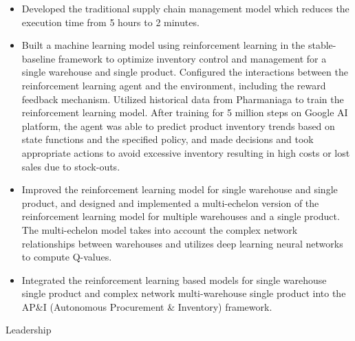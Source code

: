 \documentclass[margin, 10pt]{res} %
\begin{document}
\begin{resume}
\begin{itemize}
    \item Developed the traditional supply chain management model which reduces the execution time from 5 hours to 2 minutes.
    \item Built a machine learning model using reinforcement learning in the stable-baseline framework to optimize inventory control and management for a single warehouse and single product. Configured the interactions between the reinforcement learning agent and the environment, including the reward feedback mechanism. Utilized historical data from Pharmaniaga to train the reinforcement learning model. After training for 5 million steps on Google AI platform, the agent was able to predict product inventory trends based on state functions and the specified policy, and made decisions and took appropriate actions to avoid excessive inventory resulting in high costs or lost sales due to stock-outs.
    \item Improved the reinforcement learning model for single warehouse and single product, and designed and implemented a multi-echelon version of the reinforcement learning model for multiple warehouses and a single product. The multi-echelon model takes into account the complex network relationships between warehouses and utilizes deep learning neural networks to compute Q-values.
    \item Integrated the reinforcement learning based models for single warehouse single product and complex network multi-warehouse single product into the AP\&I (Autonomous Procurement \& Inventory) framework.
\end{itemize}
\textrm{Leadership}
\begin{itemize}

\end{itemize}
\end{resume}
\end{document}
